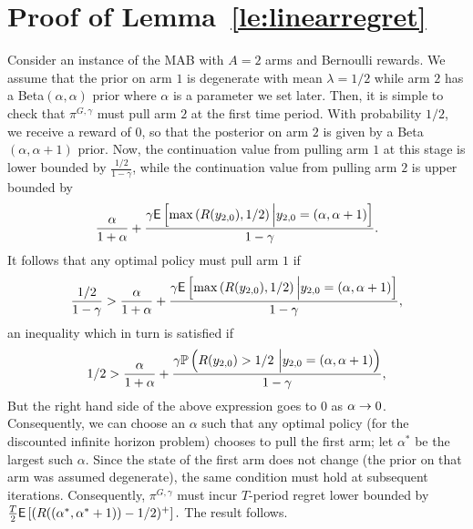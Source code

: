 \appendix
\section{Proof of Lemma~\ref{le:linearregret}} \label{proof:linearregret}
\begin{myproof}[Proof.]
	Consider an instance of the MAB with $A=2$ arms and Bernoulli rewards. We assume that the prior on arm $1$ is degenerate with mean $\lambda = 1/2$ while arm $2$ has a {\rm Beta}$(\alpha,\alpha)$ prior where $\alpha$ is a parameter we set later. Then, it is simple to check that $\pi^{G,\gamma}$ must pull arm $2$ at the first time period. With probability $1/2$, we receive a reward of $0$, so that the posterior on arm $2$ is given by a {\rm Beta}$(\alpha,\alpha+1)$ prior. Now, the continuation value from pulling arm $1$ at this stage is lower bounded by $\frac{1/2}{1-\gamma}$, while the continuation value from pulling arm $2$ is upper bounded by
	\[
	\frac{\alpha}{1+\alpha}
	+
	\frac{
		\gamma
		\E
		\left[
		\max\left(
		R(y_{2,0}),1/2
		\right)
		\Big| y_{2,0} = \left(\alpha, \alpha+1 \right)
		\right]
	}
	{
		1-\gamma
	}.
	\]
	It follows that any optimal policy must pull arm $1$ if
	\[
	\frac{1/2}{1-\gamma}
	>
	\frac{\alpha}{1+\alpha}
	+
	\frac{
		\gamma
		\E
		\left[
		\max\left(
		R(y_{2,0}),1/2
		\right)
		\Big| y_{2,0} = \left(\alpha, \alpha+1 \right)
		\right]
	}
	{
		1-\gamma
	},
	\]
	an inequality which in turn is satisfied if
	\[
	1/2
	>
	\frac{\alpha}{1+\alpha}
	+
	\frac{
		\gamma
		\P{
			R(y_{2,0})>1/2 \
			\Big| y_{2,0} = \left(\alpha, \alpha+1 \right)
		}
	}
	{
		1-\gamma
	},
	\]
	But the right hand side of the above expression goes to $0$ as $\alpha \tends 0$. Consequently, we can choose an $\alpha$ such that any optimal policy (for the discounted infinite horizon problem) chooses to pull the first arm; let $\alpha^*$ be the largest such $\alpha$. Since the state of the first arm does not change (the prior on that arm was assumed degenerate), the same condition must hold at subsequent iterations. Consequently, $\pi^{G,\gamma}$ must incur $T$-period regret lower bounded by 
	$\frac{T}{2}
	\E
	\left[
	(
	R((\alpha^*,\alpha^*+1)) - 1/2
	)^+
	\right].
	$
	The result follows. 
\end{myproof}
